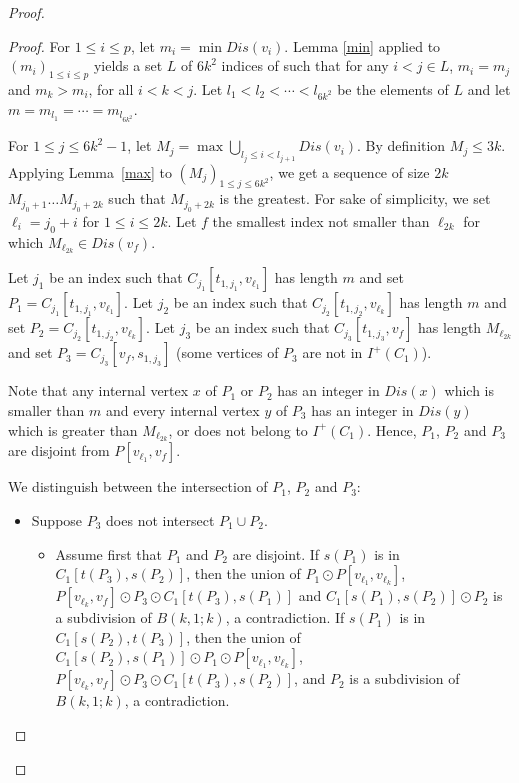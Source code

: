 \documentclass{endm}
\begin{document}
\begin{proof}
\begin{proof}
For $1\leq i\leq p$, let $m_i = \min Dis(v_i)$. 
Lemma \ref{min} applied to $(m_i)_{1\leq i\leq p}$ yields a set $L$ of $6k^2$ indices of such that 
for any $i< j \in L$,  $m_i=m_j$ and $m_k > m_i$, for all $i< k < j$.
Let $l_1 < l_2 < \cdots < l_{6k^2}$ be the elements of $L$ and let $m= m_{l_1} = \cdots = m_{l_{6k^2}}$.


For $1\leq j\leq 6k^2-1$, let $M_j = \max \bigcup_{l_j\leq i < l_{j+1}} Dis(v_i)$.
By definition $M_j\leq 3k$.
Applying Lemma~\ref{max} to $(M_j)_{1\leq j\leq 6k^2}$,  we get a sequence of size $2k$ $M_{j_0+1} \dots M_{j_0+{2k}}$ such that $M_{j_0+{2k}}$ is the greatest. For sake of simplicity, we set $\ell_i =j_0+i$ for $1\leq i\leq 2k$.
Let $f$ the smallest index not smaller than $\ell_{2k}$ for which $M_{\ell_{2k}} \in Dis (v_f)$. 

Let $j_1$ be an index such that $C_{j_1}[t_{1,j_1},v_{\ell_1}]$ has length $m$ and set $P_1=C_{j_1}[t_{1,j_1},v_{\ell_1}]$.
Let $j_2$ be an index such that $C_{j_2}[t_{1,j_2},v_{\ell_k}]$ has length $m$ and set $P_2=C_{j_2}[t_{1,j_2},v_{\ell_k}]$.
Let $j_3$ be an index such that  $C_{j_3}[t_{1,j_3},v_{f}]$ has length $M_{\ell_{2k}}$ and set $P_3=C_{j_3}[v_f, s_{1,j_3}]$ (some vertices of $P_3$ are not in $I^+(C_1)$).

Note that any internal vertex $x$ of $P_1$ or $P_2$ has an integer in $Dis(x)$
which is smaller than $m$ and every internal vertex $y$ of $P_3$ has an integer in $Dis(y)$ which
is greater than $M_{\ell_{2k}}$, or does not belong to $I^+(C_1)$. Hence, 
$P_1$, $P_2$ and $P_3$ are disjoint from $P[v_{\ell_1},v_f]$. 


We distinguish between the intersection of $P_1$, $P_2$ and $P_3$:

\begin{itemize}
	\item Suppose $P_3$ does not intersect $P_1 \cup P_2$.
	\begin{itemize}
		\item Assume first that $P_1$ and $P_2$ are disjoint. If $s(P_1)$ is in $C_1[t(P_3), s(P_2)]$, then the union of  $P_1 \odot P[v_{\ell_1}, v_{\ell_k}]$, $P[v_{\ell_k}, v_f] \odot P_3\odot C_1[t(P_3), s(P_1)]$ and $C_1[s(P_1), s(P_2)]\odot P_2$ is a subdivision of $B(k,1;k)$, a contradiction.
		 If $s(P_1)$ is in $C_1[ s(P_2), t(P_3)]$, then the union of  $C_1[s(P_2), s(P_1)]\odot P_1\odot P[v_{\ell_1}, v_{\ell_k}]$, $P[v_{\ell_k}, v_f]\odot  P_3\odot C_1[t(P_3), s(P_2)]$, and  $P_2$ is a subdivision of $B(k,1;k)$, a contradiction.
	

\end{itemize}
\end{itemize}
\end{proof}
\end{proof}
\end{document}
